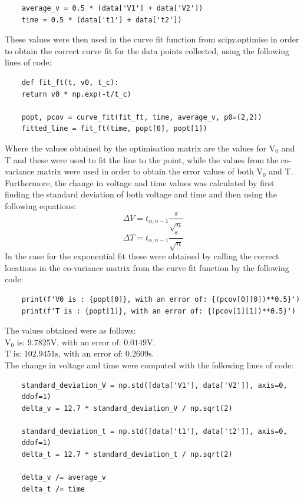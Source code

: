 \documentclass[12pt, a4paper]{article}
\begin{document}
\begin{verbatim}
    average_v = 0.5 * (data['V1'] + data['V2']) 
    time = 0.5 * (data['t1'] + data['t2'])
\end{verbatim}    
These values were then used in the curve fit function from scipy.optimise in order to obtain the correct curve fit for the data points collected, using the following lines of code:
\begin{verbatim}
    def fit_ft(t, v0, t_c):
    return v0 * np.exp(-t/t_c)
 
    popt, pcov = curve_fit(fit_ft, time, average_v, p0=(2,2))
    fitted_line = fit_ft(time, popt[0], popt[1])
\end{verbatim}
Where the values obtained by the optimisation matrix are the values for $\text{V}_0$ and T and these were used to fit the line to the point, while the values from the co-variance matrix were used in order to obtain the error values of both $\text{V}_0$ and T. 
Furthermore, the change in voltage and time values was calculated by first finding the standard deviation of both voltage and time and then using the following equations:
\begin{equation}
    \Delta V = t_{\alpha, n-1} \frac{s}{\sqrt{n}}
\end{equation}
\begin{equation}
    \Delta T = t_{\alpha, n-1} \frac{s}{\sqrt{n}}
\end{equation}
In the case for the exponential fit these were obtained by calling the correct locations in the co-variance matrix from the curve fit function by the following code:
\begin{verbatim}
    print(f'V0 is : {popt[0]}, with an error of: {(pcov[0][0])**0.5}')
    print(f'T is : {popt[1]}, with an error of: {(pcov[1][1])**0.5}')
\end{verbatim}
The values obtained were as follows:\\
\indent$\text{V}_0 \text{ is: 9.7825V, with an error of: 0.0149V.}$\\
\indent$\text{T} \text{ is: 102.9451s, with an error of: 0.2609s.}$\\
The change in voltage and time were computed with the following lines of code:
\begin{verbatim}
    standard_deviation_V = np.std([data['V1'], data['V2']], axis=0, 
    ddof=1)
    delta_v = 12.7 * standard_deviation_V / np.sqrt(2)
    
    standard_deviation_t = np.std([data['t1'], data['t2']], axis=0, 
    ddof=1)
    delta_t = 12.7 * standard_deviation_t / np.sqrt(2)
    
    delta_v /= average_v
    delta_t /= time
\end{verbatim}
\end{document}
